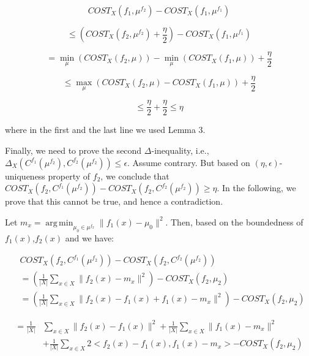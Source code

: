 \documentclass[letterpaper,12pt,titlepage,oneside,final]{book}
\DeclareMathOperator*{\argmin}{arg\,min}
\begin{document}
\begin{equation}
COST_X(f_1, \mu^{f_2}) - COST_X(f_1, \mu^{f_1})
\end{equation}

\begin{equation}
\leq \left( COST_X(f_2, \mu^{f_2}) + \frac{\eta}{2}\right) - COST_X(f_1, \mu^{f_1})
\end{equation}

\begin{equation}
=  \min_{\mu}(COST_X(f_2, \mu)) - \min_{\mu}(COST_X(f_1, \mu)) + \frac{\eta}{2}
\end{equation}

\begin{equation}
\leq  \max_{\mu}\left(COST_X(f_2, \mu) - COST_X(f_1, \mu)\right) + \frac{\eta}{2}
\end{equation}

\begin{equation}
\leq \frac{\eta}{2}  + \frac{\eta}{2} \leq \eta
\end{equation}

where in the first and the last line we used Lemma 3. 


Finally, we need to prove the second $\Delta$-inequality, i.e., $\Delta_X(C^{f_1}(\mu^{f_2}), C^{f_2}(\mu^{f_2})) \leq \epsilon$. Assume contrary. But based on $(\eta,\epsilon)$-uniqueness property of $f_2$, we conclude that $COST_X(f_2, C^{f_1}(\mu^{f_2})) - COST_X(f_2, C^{f_2}(\mu^{f_2})) \geq \eta$. In the following, we prove that this cannot be true, and hence a contradiction.

Let $m_x = \argmin_{\mu_0\in \mu^{f_2}} \|f_1(x)-\mu_0 \|^2$. Then, based on the boundedness of $f_1(x)$,$f_2(x)$ and  we have:

\begin{align}
&COST_X(f_2, C^{f_1}(\mu^{f_2})) - COST_X(f_2, C^{f_2}(\mu^{f_2}))\\
&=\left( \frac{1}{|X|}\sum_{x\in X} 
\| f_2(x) - m_x \|^2
\right)  - COST_X(f_2, \mu_2)\\
&=\left( \frac{1}{|X|}\sum_{x\in X} 
\| f_2(x) - f_1(x) + f_1(x) - m_x \|^2 \right)
 - COST_X(f_2, \mu_2)
\end{align}

\begin{equation}
\begin{aligned} 
= \frac{1}{|X|}&\sum_{x\in X} \| f_2(x) - f_1(x) \|^2
+ \frac{1}{|X|}\sum_{x\in X} \| f_1(x) - m_x \|^2 \\  
 &+ \frac{1}{|X|}\sum_{x\in X} 2<f_2(x) - f_1(x),f_1(x)- m_x>
 - COST_X(f_2, \mu_2)
\end{aligned}
\end{equation}
\end{document}
